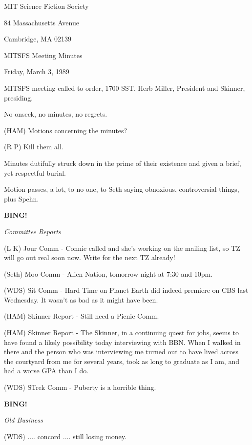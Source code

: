 \documentclass[12pt]{article}
\newcommand{\bing}{{\bf BING!} }
\newcommand{\goto}[1]{\bing \vskip 12pt \centerline{{\em{#1}}}}
\begin{document}
\begin{center}

MIT Science Fiction Society 

84 Massachusetts Avenue

Cambridge, MA 02139

\vspace{12pt}

MITSFS Meeting Minutes 

Friday, March 3, 1989

\end{center}
 
\vspace{18pt}

\setlength{\parskip}{6pt}

\noindent
MITSFS meeting called to order, 1700 SST, Herb Miller, President and Skinner, presiding.

No onseck, no minutes, no regrets.

(HAM) Motions concerning the minutes?

(R P) Kill them all.

Minutes dutifully struck down in the prime of their existence and given a brief, yet respectful burial.

Motion passes, a lot, to no one, to Seth saying obnoxious, controversial things, plus Spehn.

\goto{Committee Reports}

(L K) Jour Comm - Connie called and she's working on the mailing list, so TZ will go out real soon now. Write for the next TZ already!

(Seth) Moo Comm - Alien Nation, tomorrow night at 7:30 and 10pm.

(WDS) Sit Comm - Hard Time on Planet Earth did indeed premiere on CBS last Wednesday. It wasn't as bad as it might have been.

(HAM) Skinner Report - Still need a Picnic Comm.

(HAM) Skinner Report - The Skinner, in a continuing quest for jobs, seems to have found a likely possibility today interviewing with BBN. When I walked in there and the person who was interviewing me turned out to have lived across the courtyard from me for several years, took as long to graduate as I am, and had a worse GPA than I do.

(WDS) STrek Comm - Puberty is a horrible thing.

\goto{Old Business}

(WDS) .... concord .... still losing money.
\end{document}
